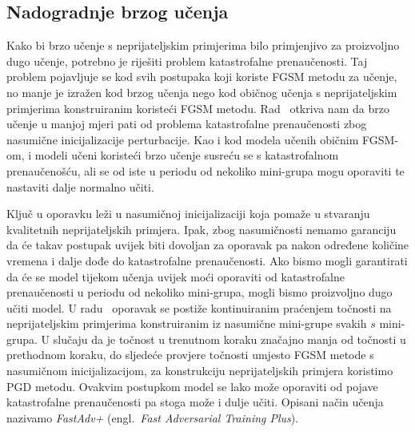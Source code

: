 \documentclass[times, utf8, zavrsni, numeric]{fer}
\begin{document}
\subsection{Nadogradnje brzog učenja}

Kako bi brzo učenje s neprijateljskim primjerima bilo primjenjivo za proizvoljno dugo učenje, potrebno je riješiti problem katastrofalne prenaučenosti.
Taj problem pojavljuje se kod svih postupaka koji koriste FGSM metodu za učenje, no manje je izražen kod brzog učenja nego kod običnog učenja s neprijateljskim primjerima konstruiranim koristeći FGSM metodu.
Rad~\cite{li2020towards} otkriva nam da brzo učenje u manjoj mjeri pati od problema katastrofalne prenaučenosti zbog nasumične inicijalizacije perturbacije.
Kao i kod modela učenih običnim FGSM-om, i modeli učeni koristeći brzo učenje susreću se s katastrofalnom prenaučenošću, ali se od iste u periodu od nekoliko mini-grupa mogu oporaviti te nastaviti dalje normalno učiti.

Ključ u oporavku leži u nasumičnoj inicijalizaciji koja pomaže u stvaranju kvalitetnih neprijateljskih primjera. 
Ipak, zbog nasumičnosti nemamo garanciju da će takav postupak uvijek biti dovoljan za oporavak pa nakon određene količine vremena i dalje dođe do katastrofalne prenaučenosti.
Ako bismo mogli garantirati da će se model tijekom učenja uvijek moći oporaviti od katastrofalne prenaučenosti u periodu od nekoliko mini-grupa, mogli bismo proizvoljno dugo učiti model.
U radu~\cite{li2020towards} oporavak se postiže kontinuiranim praćenjem točnosti na neprijateljskim primjerima konstruiranim iz nasumične mini-grupe svakih $s$ mini-grupa. 
U slučaju da je točnost u trenutnom koraku značajno manja od točnosti u prethodnom koraku, do sljedeće provjere točnosti umjesto FGSM metode s nasumičnom inicijalizacijom, za konstrukciju neprijateljskih primjera koristimo PGD metodu.
Ovakvim postupkom model se lako može oporaviti od pojave katastrofalne prenaučenosti pa stoga može i dulje učiti.
Opisani način učenja nazivamo \textit{FastAdv+} (engl.\ \textit{Fast Adversarial Training Plus}).
\end{document}
